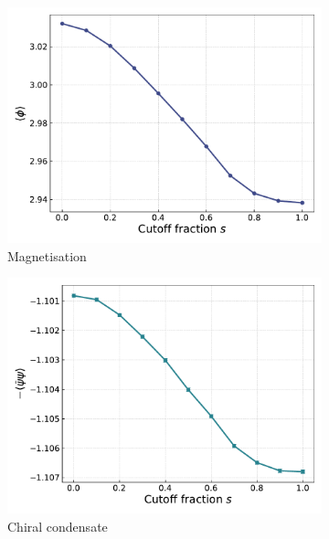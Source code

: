 \begin{figure}[h]
    \centering
    \begin{subfigure}[b]{0.47\textwidth}
        \includegraphics[width=1.0\textwidth]{figures/slide_broken/magnetisation.pdf}
        \caption{Magnetisation}
    \end{subfigure}
    \begin{subfigure}[b]{0.47\textwidth}
        \includegraphics[width=1.0\textwidth]{figures/slide_broken/condensate.pdf}
        \caption{Chiral condensate}
    \end{subfigure}
    \begin{subfigure}[b]{0.47\textwidth}

\end{subfigure}
\end{figure}

